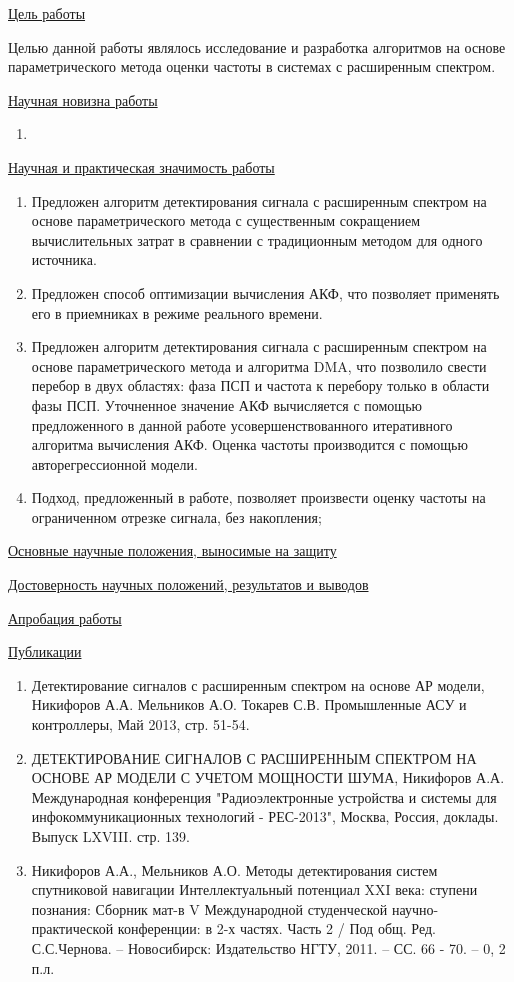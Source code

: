 \underline{Цель работы}

Целью данной работы являлось исследование и разработка алгоритмов на основе параметрического метода оценки частоты в системах 
с расширенным спектром.

\underline{Научная новизна работы}
\begin{enumerate}
	\item
\end{enumerate}

\underline{Научная и практическая значимость работы}
\begin{enumerate}
	\item Предложен алгоритм детектирования сигнала с расширенным спектром на основе параметрического метода с существенным
		сокращением вычислительных затрат в сравнении с традиционным методом для одного источника.
	\item Предложен способ оптимизации вычисления АКФ, что позволяет применять его в приемниках в режиме реального времени.
	\item Предложен алгоритм детектирования сигнала с расширенным спектром на основе параметрического метода и алгоритма DMA,
		что позволило свести перебор в двух областях: фаза ПСП и частота к перебору только в области фазы ПСП. Уточненное
		значение АКФ вычисляется с помощью предложенного в данной работе усовершенствованного итеративного алгоритма вычисления
		АКФ. Оценка частоты производится с помощью авторегрессионной модели.
      \item {Подход, предложенный в работе, позволяет произвести оценку частоты на ограниченном отрезке сигнала, без накопления;}
\end{enumerate}

\underline{Основные научные положения, выносимые на защиту}

\underline{Достоверность научных положений, результатов и выводов}

\underline{Апробация работы}

\underline{Публикации}
\begin{enumerate}
	\item Детектирование сигналов с расширенным спектром на основе АР модели, Никифоров А.А. Мельников А.О. Токарев С.В. Промышленные АСУ и контроллеры, Май 2013, стр. 51-54.
	\item ДЕТЕКТИРОВАНИЕ СИГНАЛОВ С РАСШИРЕННЫМ СПЕКТРОМ НА ОСНОВЕ АР МОДЕЛИ С УЧЕТОМ МОЩНОСТИ ШУМА, Никифоров А.А. Международная конференция
		"Радиоэлектронные устройства и системы для инфокоммуникационных технологий - РЕС-2013", Москва, Россия, доклады. Выпуск LXVIII. стр. 139.
	\item Никифоров А.А., Мельников А.О. Методы детектирования систем спутниковой навигации Интеллектуальный потенциал XXI века: ступени познания:
		Сборник мат-в V Международной студенческой научно-практической конференции: в 2-х частях. Часть 2 / Под общ. Ред. С.С.Чернова. – Новосибирск:
		Издательство НГТУ, 2011. – СС. 66 - 70. – 0, 2 п.л.
\end{enumerate}

